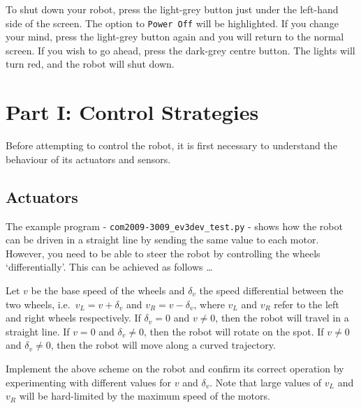 \documentclass[hidelinks,a4paper,11pt]{article}
\begin{document}
To shut down your robot, press the light-grey button just under the left-hand side of the screen.  The option to \texttt{Power Off} will be highlighted.  If you change your mind, press the light-grey button again and you will return to the normal screen.  If you wish to go ahead, press the dark-grey centre button.  The lights will turn red, and the robot will shut down.





\newpage

\section{Part I: Control Strategies}

Before attempting to control the robot, it is first necessary to understand the behaviour of its actuators and sensors.


\subsection{Actuators}

The example program - \texttt{com2009-3009\_ev3dev\_test.py} - shows how the robot can be driven in a straight line by sending the same value to each motor.  However, you need to be able to steer the robot by controlling the wheels `differentially'.  This can be achieved as follows \ldots

Let $v$ be the base speed of the wheels and $\delta_{v}$ the speed differential between the two wheels, i.e.\ $v_{L} = v + \delta_{v}$ and $v_{R} = v - \delta_{v}$, where  $v_{L}$ and  $v_{R}$ refer to the left and right wheels respectively.  If $\delta_{v} =0$ and $v\neq0$, then the robot will travel in a straight line.  If $v=0$ and $\delta_{v}\neq0$, then the robot will rotate on the spot.  If $v\neq0$ and $\delta_{v}\neq0$, then the robot will move along a curved trajectory.

\begin{todolist}
	\item Implement the above scheme on the robot and confirm its correct operation by experimenting with different values for $v$ and $\delta_{v}$.    Note that large values of $v_{L}$ and $v_{R}$ will be hard-limited by the maximum speed of the motors.
\end{todolist}
\end{document}
